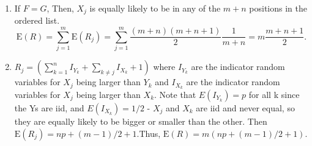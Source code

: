 \begin{enumerate}[label=(\alph*)]
\item If $F=G$, Then, $X_{j}$ is equally likely to be in any of the $m + n$
positions in the ordered list. 
$$\text{E}(R) = \sum_{j=1}^{m}\text{E}(R_{j}) = \sum_{j=1}^{m}\frac{(m+n)
(m+n+1)}{2}\frac{1}{m+n} = m\frac{m+n+1}{2}.$$

\item $R_{j} = (\sum_{k=1}^{n}I_{Y_{k}} + \sum_{k \neq j}I_{X_{k}} + 1)$ where $I_{Y_{k}}$ are the indicator random variables for $X_{j}$ being larger than $Y_{k}$ and $I_{X_{k}}$ are the indicator random variables for $X_{j}$ being larger than $X_{k}$. Note that $E(I_{Y_{k}}) = p$ for all k since the Ys are iid, and $E(I_{X_{k}}) = 1/2$ - $X_{j}$ and $X_{k}$ are iid and never equal, so they are equally likely to be bigger or smaller than the other. Then $\text{E}(R_{j}) = np + (m-1)/2 + 1$.Thus, $\text{E}(R) = m(np + (m-1)/2 + 1)$.
\end{enumerate}
